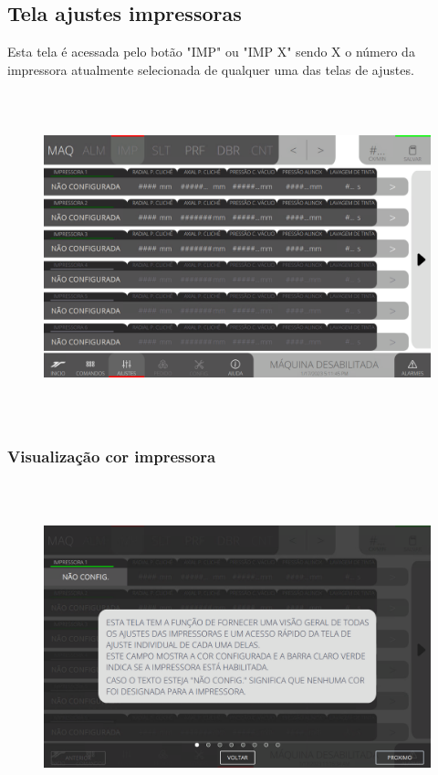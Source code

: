 \thispagestyle{fancy}
\vspace*{40 pt}
\subsection{Tela ajustes impressoras}\label{telaAjustesImpressoras}
Esta tela é acessada pelo botão "IMP" ou "IMP X" sendo X o número da impressora atualmente selecionada de qualquer uma das telas de ajustes.
\vspace*{\fill}
\begin{figure}[h]
  \centering
  \includegraphics[width=576px,height=360px]{src/imagesFlexo/04-printter/01-printters/settings/e-Tela-Principal.png}
\end{figure}
\vspace*{\fill}

\newpage
\thispagestyle{fancy}
\vspace*{40 pt}
\subsubsection{\small{Visualização cor impressora}}\label{telaAjustesImpressorasVisualizacaoCorImpressora}
\vspace*{\fill}
\begin{figure}[h]
  \centering
  \includegraphics[width=576px,height=360px]{src/imagesFlexo/04-printter/01-printters/settings/e-1.png}
\end{figure}
\vspace*{\fill}

